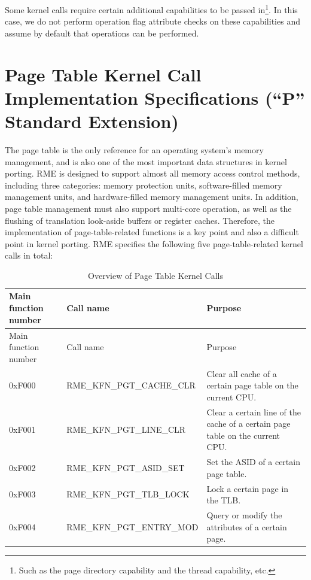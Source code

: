 Some kernel calls require certain additional capabilities to be passed in\footnote{Such as the page directory capability and the thread capability, etc.}. In this case, we do not perform operation flag attribute checks on these capabilities and assume by default that operations can be performed.

\section{Page Table Kernel Call Implementation Specifications (``P'' Standard Extension)}\label{sec:8-page-table-kernel-calls}

The page table is the only reference for an operating system's memory management, and is also one of the most important data structures in kernel porting. RME is designed to support almost all memory access control methods, including three categories: memory protection units, software-filled memory management units, and hardware-filled memory management units. In addition, page table management must also support multi-core operation, as well as the flushing of translation look-aside buffers or register caches. Therefore, the implementation of page-table-related functions is a key point and also a difficult point in kernel porting. RME specifies the following five page-table-related kernel calls in total:

\begin{xltabular}{\textwidth}{@{}>{\hsize\raggedright\arraybackslash}X>{\hsize\raggedright\arraybackslash}X>{\hsize\raggedright\arraybackslash}X@{}}
\caption{Overview of Page Table Kernel Calls}\label{tab:8-1-page-table-kernel-calls}\\
\toprule
Main function number & Call name & Purpose\tabularnewline
\endfirsthead
\toprule
Main function number & Call name & Purpose\tabularnewline
\midrule
\endhead
\bottomrule
\endlastfoot
0xF000 & RME\_KFN\_PGT\_CACHE\_CLR &
Clear all cache of a certain page table on the current CPU.\tabularnewline
0xF001 & RME\_KFN\_PGT\_LINE\_CLR &
Clear a certain line of the cache of a certain page table on the current CPU.\tabularnewline
0xF002 & RME\_KFN\_PGT\_ASID\_SET & Set the ASID of a certain page table.\tabularnewline
0xF003 & RME\_KFN\_PGT\_TLB\_LOCK & Lock a certain page in the TLB.\tabularnewline
0xF004 & RME\_KFN\_PGT\_ENTRY\_MOD & Query or modify the attributes of a certain page.\tabularnewline
\end{xltabular}
\nopagebreak[4]

